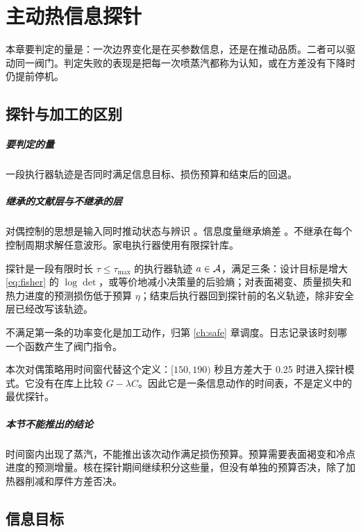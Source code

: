 \chapter{主动热信息探针}
\label{ch:ati}

本章要判定的量是：一次边界变化是在买参数信息，还是在推动品质。二者可以驱动同一阀门。判定失败的表现是把每一次喷蒸汽都称为认知，或在方差没有下降时仍提前停机。

\section{探针与加工的区别}

\paragraph{要判定的量}
一段执行器轨迹是否同时满足信息目标、损伤预算和结束后的回退。

\paragraph{继承的文献层与不继承的层}
对偶控制的思想是输入同时推动状态与辨识 \cite{feldbaum1965}。信息度量继承熵差 \cite{lindley1956}。不继承在每个控制周期求解任意波形。家电执行器使用有限探针库。

\begin{definition}[热信息探针]
探针是一段有限时长 \(\tau\le\tau_{\max}\) 的执行器轨迹 \(a\in\mathcal{A}\)，满足三条：设计目标是增大 \eqref{eq:fisher} 的 \(\log\det\)，或等价地减小决策量的后验熵；对表面褐变、质量损失和热力进度的预测损伤低于预算 \(\eta\)；结束后执行器回到探针前的名义轨迹，除非安全层已经改写该轨迹。
\end{definition}

不满足第一条的功率变化是加工动作，归第 \ref{ch:safe} 章调度。日志记录该时刻哪一个函数产生了阀门指令。

本次对偶策略用时间窗代替这个定义：\([150,190)\) 秒且方差大于 0.25 时进入探针模式。它没有在库上比较 \(G-\lambda C\)。因此它是一条信息动作的时间表，不是定义中的最优探针。

\paragraph{本节不能推出的结论}
时间窗内出现了蒸汽，不能推出该次动作满足损伤预算。预算需要表面褐变和冷点进度的预测增量。核在探针期间继续积分这些量，但没有单独的预算否决，除了加热器削减和厚件方差否决。

\section{信息目标}

